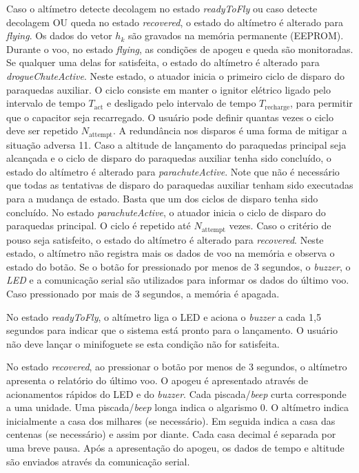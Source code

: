 \documentclass[12pt,a4paper]{article}
\begin{document}
Caso o altímetro detecte decolagem no estado \textit{readyToFly} ou caso detecte decolagem OU queda no estado \textit{recovered}, o estado do altímetro é alterado para \textit{flying}. Os dados do vetor $h_k$ são gravados na memória permanente (EEPROM). Durante o voo, no estado \textit{flying}, as condições de apogeu e queda são monitoradas. Se qualquer uma delas for satisfeita, o estado do altímetro é alterado para \textit{drogueChuteActive}. Neste estado, o atuador inicia o primeiro ciclo de disparo do paraquedas auxiliar. O ciclo consiste em manter o ignitor elétrico ligado pelo intervalo de tempo $T_\text{act}$ e desligado pelo intervalo de tempo $T_\text{recharge}$, para permitir que o capacitor seja recarregado. O usuário pode definir quantas vezes o ciclo deve ser repetido $N_\text{attempt}$. A redundância nos disparos é uma forma de mitigar a situação adversa 11. Caso a altitude de lançamento do paraquedas principal seja alcançada e o ciclo de disparo do paraquedas auxiliar tenha sido concluído, o estado do altímetro é alterado para \textit{parachuteActive}. Note que não é necessário que todas as tentativas de disparo do paraquedas auxiliar tenham sido executadas para a mudança de estado. Basta que um dos ciclos de disparo tenha sido concluído. No estado \textit{parachuteActive}, o atuador inicia o ciclo de disparo do paraquedas principal. O ciclo é repetido até $N_\text{attempt}$ vezes. Caso o critério de pouso seja satisfeito, o estado do altímetro é alterado para \textit{recovered}. Neste estado, o altímetro não registra mais os dados de voo na memória e observa o estado do botão. Se o botão for pressionado por menos de 3 segundos, o \textit{buzzer}, o \textit{LED} e a comunicação serial são utilizados para informar os dados do último voo. Caso pressionado por mais de 3 segundos, a memória é apagada.

No estado \textit{readyToFly}, o altímetro liga o LED e aciona o \textit{buzzer} a cada 1,5 segundos para indicar que o sistema está pronto para o lançamento. O usuário não deve lançar o minifoguete se esta condição não for satisfeita.

No estado \textit{recovered}, ao pressionar o botão por menos de 3 segundos, o altímetro apresenta o relatório do último voo. O apogeu é apresentado através de acionamentos rápidos do LED e do \textit{buzzer}. Cada piscada/\textit{beep} curta corresponde a uma unidade. Uma piscada/\textit{beep} longa indica o algarismo 0. O altímetro indica inicialmente a casa dos milhares (se necessário). Em seguida indica a casa das centenas (se necessário) e assim por diante. Cada casa decimal é separada por uma breve pausa. Após a apresentação do apogeu, os dados de tempo e altitude são enviados através da comunicação serial.
\end{document}

